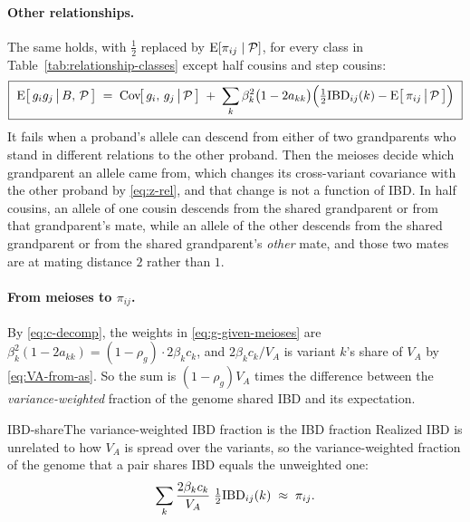 \documentclass[12pt]{article}
\begin{document}
\paragraph{Other relationships.}
The same holds, with $\tfrac12$ replaced by $\mathrm{E}[\pi_{ij} \mid \mathcal{P}]$, for every class in Table~\ref{tab:relationship-classes} except half cousins and step cousins:
\begin{equation}\label{eq:g-given-meioses}
    \boxed{\ \mathrm{E}\big[\,g_i g_j \,\big|\, B,\, \mathcal{P}\,\big]
    \;=\; \mathrm{Cov}\!\big[\,g_i,\, g_j \,\big|\, \mathcal{P}\,\big]
    \;+\; \sum_k \beta_k^2\big(1 - 2a_{kk}\big)\Big(\tfrac12\mathrm{IBD}_{ij}(k) - \mathrm{E}\big[\,\pi_{ij} \,\big|\, \mathcal{P}\,\big]\Big) \ }
\end{equation}
It fails when a proband's allele can descend from either of two grandparents who stand in different relations to the other proband.
Then the meioses decide which grandparent an allele came from, which changes its cross-variant covariance with the other proband by \eqref{eq:z-rel}, and that change is not a function of IBD.
In half cousins, an allele of one cousin descends from the shared grandparent or from that grandparent's mate, while an allele of the other descends from the shared grandparent or from the shared grandparent's \emph{other} mate, and those two mates are at mating distance $2$ rather than $1$.

\paragraph{From meioses to $\pi_{ij}$.}
By \eqref{eq:c-decomp}, the weights in \eqref{eq:g-given-meioses} are $\beta_k^2(1 - 2a_{kk}) = (1-\rho_g)\cdot 2\beta_k c_k$, and $2\beta_k c_k / V_A$ is variant $k$'s share of $V_A$ by \eqref{eq:VA-from-as}.
So the sum is $(1-\rho_g)V_A$ times the difference between the \emph{variance-weighted} fraction of the genome shared IBD and its expectation.

\begin{approximation}{IBD-share}{The variance-weighted IBD fraction is the IBD fraction}
    Realized IBD is unrelated to how $V_A$ is spread over the variants, so the variance-weighted fraction of the genome that a pair shares IBD equals the unweighted one:
    $$ \sum_k \frac{2\beta_k c_k}{V_A}\;\tfrac12\mathrm{IBD}_{ij}(k) \;\approx\; \pi_{ij} . $$
\end{approximation}
\end{document}
